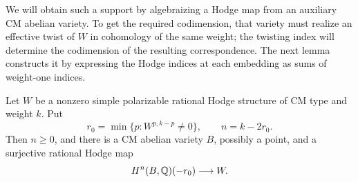 We will obtain such a support by algebraizing a Hodge map from an
auxiliary CM abelian variety.  To get the required codimension, that
variety must realize an effective twist of \(W\) in cohomology of the
same weight; the twisting index will determine the codimension of the
resulting correspondence.  The next lemma constructs it by expressing
the Hodge indices at each embedding as sums of weight-one indices.

\begin{lemma}
\label{cc:realization}
Let \(W\) be a nonzero simple polarizable rational Hodge structure of
CM type and weight \(k\). Put
\[
 r_0=\min\{p:W^{p,k-p}\ne0\},\qquad n=k-2r_0.
\]
Then \(n\ge0\), and there is a CM abelian variety \(B\), possibly a
point, and a surjective rational Hodge map
\[
 H^n(B,\mathbb{Q})(-r_0)\longrightarrow W.
\]
\end{lemma}

